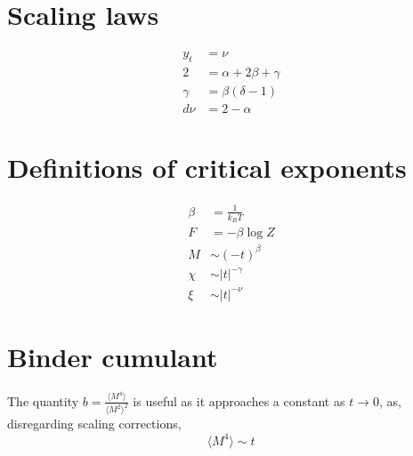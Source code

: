\section{Scaling laws}
\begin{align}
  	y_t &= \nu\\
	2 &= \alpha + 2\beta + \gamma \\
	\gamma &= \beta(\delta -1)\\
	d\nu &= 2 - \alpha
\end{align}
\section{Definitions of critical exponents}
\begin{align}
  \beta &= \frac{1}{k_B T} \\
  F &= -\beta \log Z\\
  M &\sim (-t)^{\beta}\\
  \chi &\sim |t|^{-\gamma}\\
  \xi &\sim |t|^{-\nu}
\end{align}  
\section{Binder cumulant}
The quantity $b =\frac{\langle M^4 \rangle}{\langle M^2\rangle^2}$ is useful as it approaches a constant as $t\rightarrow 0 $, as,  disregarding scaling corrections,
\begin{equation}
  \langle M^4 \rangle \sim t^{}
\end{equation}
